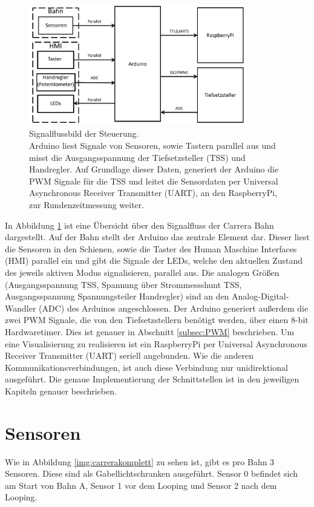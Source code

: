 \documentclass[a4paper, 11pt]{report}
\begin{document}
	\begin{figure}[ht]
		\centering
		\includegraphics[width=0.85\textwidth]{rec/signalfluss.pdf}
		\caption[Signalflussbild der Steuerung]{Signalflussbild der Steuerung. \\Arduino liest Signale von Sensoren, sowie Tastern parallel aus und misst die Ausgangsspannung der Tiefsetzsteller (TSS) und Handregler. Auf Grundlage dieser Daten, generiert der Arduino die PWM Signale für die TSS und leitet die Sensordaten per Universal Asynchronous Receiver Transmitter (UART), an den RaspberryPi, zur Rundenzeitmessung weiter.}
		\label{img:signalfluss}
	\end{figure}
	
	In Abbildung \ref{img:signalfluss} ist eine Übersicht über den Signalfluss der Carrera Bahn dargestellt.
	Auf der Bahn stellt der Arduino das zentrale Element dar.
	Dieser liest die Sensoren in den Schienen, sowie die Taster des Human Maschine Interfaces (HMI) parallel ein und gibt die Signale der LEDs, welche den aktuellen Zustand des jeweils aktiven Modus signalisieren, parallel aus.
	Die analogen Größen (Ausgangsspannung TSS, Spannung über Strommessshunt TSS, Ausgangsspannung Spannungsteiler Handregler) sind an den Analog-Digital-Wandler (ADC) des Arduinos angeschlossen.
	Der Arduino generiert außerdem die zwei PWM Signale, die von den Tiefsetzstellern benötigt werden, über einen 8-bit Hardwaretimer.
	Dies ist genauer in Abschnitt \ref{subsec:PWM} beschrieben.
	Um eine Visualisierung zu realisieren ist ein RaspberryPi per Universal Asynchronous Receiver Transmitter (UART) seriell angebunden. Wie die anderen Kommunikationsverbindungen, ist auch diese Verbindung nur unidirektional ausgeführt.
	Die genaue Implementierung der Schnittstellen ist in den jeweiligen Kapiteln genauer beschrieben.

	\section{Sensoren}
		Wie in Abbildung \ref{img:carrerakomplett} zu sehen ist, gibt es pro Bahn 3 Sensoren. Diese sind als Gabellichtschranken ausgeführt. Sensor 0 befindet sich am Start von Bahn A, Sensor 1 vor dem Looping und Sensor 2 nach dem Looping.\\
\end{document}
